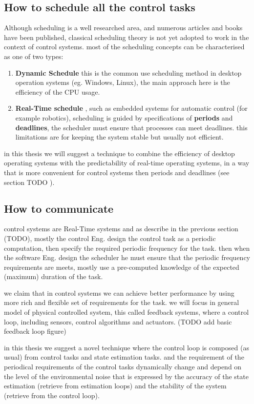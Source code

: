 \documentclass[11pt]{article}
\begin{document}
\subsection{How to schedule all the control tasks}
Although scheduling is a well researched area, and numerous articles and books have been published, classical scheduling theory is not yet adopted to work in the context of control systems.
most of the scheduling concepts can be characterised as one of two types:
\begin{enumerate}
\item \textbf{Dynamic Schedule}{
this is the common use scheduling method in desktop operation systems (eg. Windows, Linux), 
the main approach here is the efficiency of the CPU usage.
}
\item \textbf{Real-Time schedule}{
, such as embedded systems for automatic control (for example robotics), 
scheduling is guided by specifications of \textbf{periods} and \textbf{deadlines}, the scheduler must ensure that processes can meet deadlines. this limitations are for keeping the system stable but usually not efficient.
}
\end{enumerate}
in this thesis we will suggest a technique to combine the efficiency of desktop operating systems with the predictability of real-time operating systems,
in a way that is more convenient for control systems then periods and deadlines (see section TODO ).

\subsection{How to communicate}
control systems are Real-Time systems and as describe in the previous section (TODO), mostly the control Eng. design the control task as a periodic computation, then specify the required periodic frequency for the task. then when the software Eng. design the scheduler he must ensure that the periodic frequency requirements are meets, mostly use a pre-computed knowledge of the expected (maximum) duration of the task.

we claim that in control systems we can achieve better performance by using more rich and flexible set of requirements for the task.
we will focus in general model of physical controlled system,
this called feedback systems, where a control loop, including sensors, control algorithms and actuators.
(TODO add basic feedback loop figure)

in this thesis we suggest a novel technique where the control loop is composed (as usual) from control tasks and state estimation tasks.
and the requirement of the periodical requirements of the control tasks dynamically change and depend on the level of the environmental noise that is expressed by the accuracy of the state estimation (retrieve from estimation loops) and the stability of the system (retrieve from the control loop).
\end{document}
